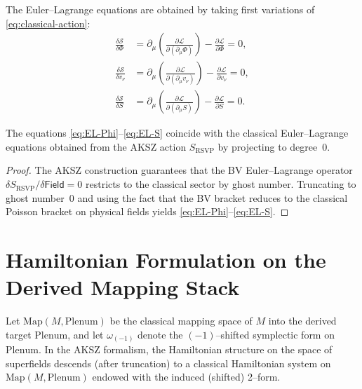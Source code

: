The Euler--Lagrange equations are obtained by taking first variations
of \eqref{eq:classical-action}:
\begin{align}
\frac{\delta\mathcal{S}}{\delta\Phi}
&=
\partial_{\mu}\left(
\frac{\partial\mathcal{L}}{\partial(\partial_{\mu}\Phi)}
\right)
-
\frac{\partial\mathcal{L}}{\partial\Phi}
=0,
\label{eq:EL-Phi}
\\[0.5em]
\frac{\delta\mathcal{S}}{\delta v_{\nu}}
&=
\partial_{\mu}\left(
\frac{\partial\mathcal{L}}{\partial(\partial_{\mu}v_{\nu})}
\right)
-
\frac{\partial\mathcal{L}}{\partial v_{\nu}}
=0,
\label{eq:EL-v}
\\[0.5em]
\frac{\delta\mathcal{S}}{\delta S}
&=
\partial_{\mu}\left(
\frac{\partial\mathcal{L}}{\partial(\partial_{\mu}S)}
\right)
-
\frac{\partial\mathcal{L}}{\partial S}
=0.
\label{eq:EL-S}
\end{align}

\begin{theorem}
\label{thm:EL-equivalence}
The equations \eqref{eq:EL-Phi}--\eqref{eq:EL-S} coincide with the
classical Euler--Lagrange equations obtained from the AKSZ action
$S_{\mathrm{RSVP}}$ by projecting to degree~$0$.
\end{theorem}

\begin{proof}
The AKSZ construction guarantees that the BV Euler--Lagrange
operator $\delta S_{\mathrm{RSVP}}/\delta\mathsf{Field}=0$ restricts
to the classical sector by ghost number.
Truncating to ghost number~$0$ and using the fact that the BV bracket
reduces to the classical Poisson bracket on physical fields yields
\eqref{eq:EL-Phi}--\eqref{eq:EL-S}.
\end{proof}



\section{Hamiltonian Formulation on the Derived Mapping Stack}
\label{sec:Hamiltonian}

Let $\mathrm{Map}(M,\mathrm{Plenum})$ be the classical mapping space
of $M$ into the derived target $\mathrm{Plenum}$,
and let $\omega_{(-1)}$ denote the $(-1)$--shifted symplectic form on
$\mathrm{Plenum}$.
In the AKSZ formalism, the Hamiltonian structure on the space of
superfields descends (after truncation) to a classical Hamiltonian
system on $\mathrm{Map}(M,\mathrm{Plenum})$ endowed with the induced
(shifted) 2--form.

